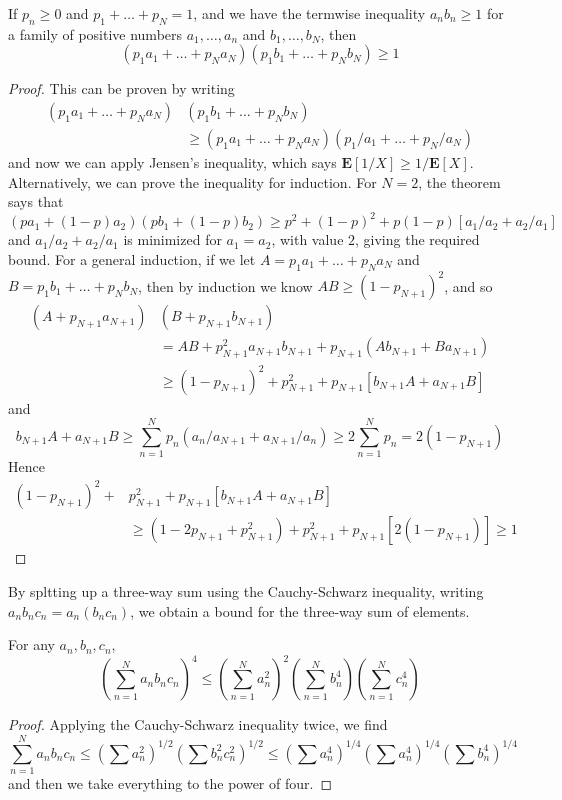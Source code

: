 \begin{theorem}
    If $p_n \geq 0$ and $p_1 + \dots + p_N = 1$, and we have the termwise inequality $a_nb_n \geq 1$ for a family of positive numbers $a_1, \dots, a_n$ and $b_1, \dots, b_N$, then
    \[ (p_1a_1 + \dots + p_Na_N)(p_1b_1 + \dots + p_Nb_N) \geq 1 \]
\end{theorem}
\begin{proof}
    This can be proven by writing
    \begin{align*}
        \left( p_1a_1 + \dots + p_N a_N \right) & \left( p_1b_1 + \dots + p_N b_N \right)\\
        &\geq \left( p_1a_1 + \dots + p_Na_N \right) \left( p_1/a_1 + \dots + p_N/a_N \right)
    \end{align*}
    and now we can apply Jensen's inequality, which says $\mathbf{E}[1/X] \geq 1/\mathbf{E}[X]$. Alternatively, we can prove the inequality for induction. For $N = 2$, the theorem says that
    \[ (pa_1 + (1 - p)a_2)(pb_1 + (1 - p)b_2) \geq p^2 + (1 - p)^2 + p(1-p)[a_1/a_2 + a_2/a_1] \]
    and $a_1/a_2 + a_2/a_1$ is minimized for $a_1 = a_2$, with value $2$, giving the required bound. For a general induction, if we let $A = p_1a_1 + \dots + p_Na_N$ and $B = p_1b_1 + \dots + p_Nb_N$, then by induction we know $AB \geq (1 - p_{N+1})^2$, and so
    \begin{align*}
    \left( A + p_{N+1}a_{N+1} \right) & \left( B + p_{N+1}b_{N+1} \right)\\
    &= AB + p_{N+1}^2a_{N+1}b_{N+1} + p_{N+1}(Ab_{N+1} + Ba_{N+1})\\
    &\geq (1 - p_{N+1})^2 + p_{N+1}^2 + p_{N+1}[b_{N+1}A + a_{N+1}B]
    \end{align*}
    and
    \[ b_{N+1}A + a_{N+1}B \geq \sum_{n = 1}^N p_n(a_n/a_{N+1} + a_{N+1}/a_n) \geq 2 \sum_{n=1}^N p_n = 2(1 - p_{N+1}) \]
    Hence
    \begin{align*}
        (1 - p_{N+1})^2 +& p_{N+1}^2 + p_{N+1}[b_{N+1}A + a_{N+1}B]\\
        &\geq (1 - 2p_{N+1} + p_{N+1}^2) + p_{N+1}^2 + p_{N+1}[2(1 - p_{N+1})] \geq 1
    \end{align*}
\end{proof}

By spltting up a three-way sum using the Cauchy-Schwarz inequality, writing $a_nb_nc_n = a_n(b_nc_n)$, we obtain a bound for the three-way sum of elements.

\begin{theorem}
    For any $a_n, b_n, c_n$,
    \[ \left( \sum_{n = 1}^N a_nb_nc_n \right)^4 \leq \left( \sum_{n = 1}^N a_n^2 \right)^2 \left( \sum_{n = 1}^N b_n^4 \right) \left( \sum_{n = 1}^N c_n^4 \right) \]
\end{theorem}
\begin{proof}
    Applying the Cauchy-Schwarz inequality twice, we find
    \[ \sum_{n = 1}^N a_nb_nc_n \leq \left( \sum a_n^2 \right)^{1/2} \left( \sum b_n^2 c_n^2 \right)^{1/2} \leq \left( \sum a_n^4 \right)^{1/4} \left( \sum a_n^4 \right)^{1/4} \left( \sum b_n^4 \right)^{1/4} \]
    and then we take everything to the power of four.
\end{proof}

